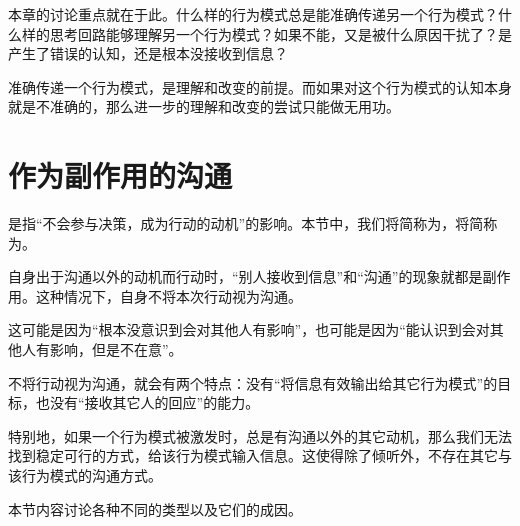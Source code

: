 本章的讨论重点就在于此。什么样的行为模式总是能准确传递另一个行为模式？什么样的思考回路能够理解另一个行为模式？如果不能，又是被什么原因干扰了？是产生了错误的认知，还是根本没接收到信息？

准确传递一个行为模式，是理解和改变的前提。而如果对这个行为模式的认知本身就是不准确的，那么进一步的理解和改变的尝试只能做无用功。



\section{作为副作用的沟通}
\begin{explain}
是指“不会参与决策，成为行动的动机”的影响。本节中，我们将简称为，将简称为。
\end{explain}
自身出于沟通以外的动机而行动时，“别人接收到信息”和“沟通”的现象就都是副作用。这种情况下，自身不将本次行动视为沟通。
\begin{explain}
这可能是因为“根本没意识到会对其他人有影响”，也可能是因为“能认识到会对其他人有影响，但是不在意”。
\end{explain}
不将行动视为沟通，就会有两个特点：没有“将信息有效输出给其它行为模式”的目标，也没有“接收其它人的回应”的能力。
\begin{explain}
特别地，如果一个行为模式被激发时，总是有沟通以外的其它动机，那么我们无法找到稳定可行的方式，给该行为模式输入信息。这使得除了倾听外，不存在其它与该行为模式的沟通方式。

\end{explain}
本节内容讨论各种不同的类型以及它们的成因。

